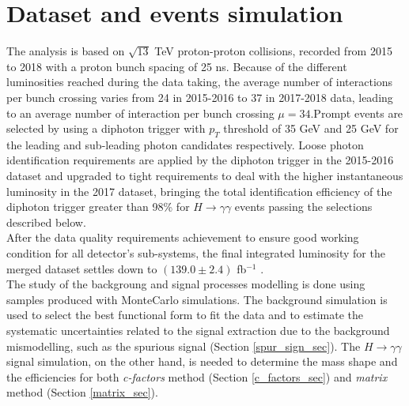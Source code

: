 \section{Dataset and events simulation}
\label{mc_sim}
The analysis is based on $\sqrt{13}$ TeV proton-proton collisions, recorded from 2015 to 2018 with a proton bunch spacing of 25 ns. Because of the different luminosities reached during the data taking, the average number of interactions per bunch crossing varies from 24 in 2015-2016 to 37 in 2017-2018 data, leading to an average number of interaction per bunch crossing $\mu=34$.Prompt events are selected by using a diphoton trigger with $p_T$ threshold of 35 GeV and 25 GeV for the leading and sub-leading photon candidates respectively. Loose photon identification requirements are applied by the diphoton trigger in the 2015-2016 dataset and upgraded to tight requirements to deal with the higher instantaneous luminosity in the 2017 dataset, bringing the total identification efficiency of the diphoton trigger greater than 98\% for $H \rightarrow \gamma\gamma$ events passing the selections described below.
\\
After the data quality requirements achievement to ensure good working condition for all detector's sub-systems, the final integrated luminosity for the merged dataset settles down to $(139.0 \pm 2.4)$ fb$^{-1}$ \cite{ATLAS-CONF-2019-021}.
\\
The study of the backgroung and signal processes modelling is done using samples produced with MonteCarlo simulations. The background simulation is used to select the best functional form to fit the data and to estimate the systematic uncertainties related to the signal extraction due to the background mismodelling, such as the spurious signal (Section \ref{spur_sign_sec}). The $H \rightarrow \gamma\gamma$ signal simulation, on the other hand, is needed to determine the mass shape and the efficiencies for both \emph{c-factors} method (Section \ref{c_factors_sec}) and \emph{matrix} method (Section \ref{matrix_sec}).
